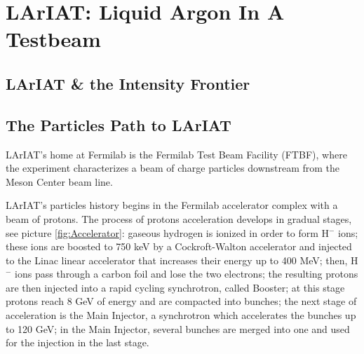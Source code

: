 \chapter{LArIAT: Liquid Argon In A Testbeam}\label{sec:experimentDescription}
\section{LArIAT \& the Intensity Frontier}
\section{The Particles Path to LArIAT}

LArIAT's home at Fermilab is the Fermilab Test Beam Facility (FTBF), where the experiment 
characterizes a beam of charge particles downstream from the Meson Center beam line. 

LArIAT's particles history begins in the Fermilab accelerator complex with a beam of protons. 
The process of protons acceleration develops in gradual stages, see picture \ref{fig:Accelerator}: gaseous hydrogen is ionized in order to form H$^{-}$ ions; these ions are boosted to 750 keV by a Cockroft-Walton accelerator and injected to the Linac linear accelerator that increases their energy up to 400 MeV; then, H$^{-}$ ions pass through a carbon foil and lose the two electrons; the resulting protons are then injected into a rapid cycling synchrotron, called Booster; at this stage protons reach 8 GeV of energy and are compacted into bunches; the next stage of acceleration is the Main Injector, a synchrotron which accelerates the bunches up to 120 GeV; in the Main Injector, several bunches are merged into one and used for the injection in the last stage.


